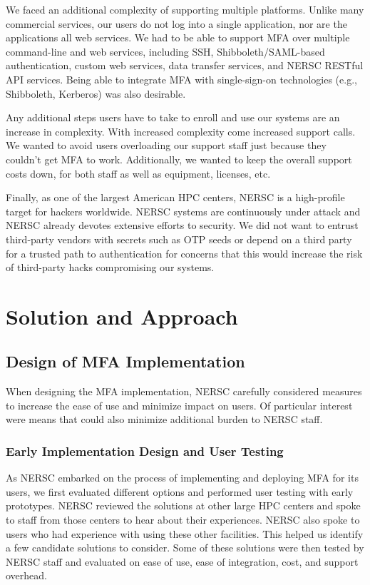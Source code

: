 \documentclass[sigconf,review]{acmart}
\begin{document}
We faced an additional complexity of supporting multiple platforms. Unlike many
commercial services, our users do not log into a single application, nor are the
applications all web services.  We had to be able to support MFA over multiple
command-line and web services, including SSH, Shibboleth/SAML-based
authentication, custom web services, data transfer services, and NERSC RESTful
API services.  Being able to integrate MFA with single-sign-on technologies
(e.g., Shibboleth, Kerberos) was also desirable.

Any additional steps users have to take to enroll and use our systems are an
increase in complexity.  With increased complexity come increased support calls.
We wanted to avoid users overloading our support staff just because they
couldn't get MFA to work.  Additionally, we wanted to keep the overall support
costs down, for both staff as well as equipment, licenses, etc.

Finally, as one of the largest American HPC centers, NERSC is a high-profile
target for hackers worldwide. NERSC systems are continuously under attack and
NERSC already devotes extensive efforts to security. We did not want to entrust
third-party vendors with secrets such as OTP seeds or depend on a third party
for a trusted path to authentication for concerns that this would increase the
risk of third-party hacks compromising our systems.


\section{Solution and Approach}
\label{solns}

\subsection{Design of MFA Implementation}
\label{design}

When designing the MFA implementation, NERSC carefully considered measures to
increase the ease of use and minimize impact on users. Of particular interest
were means that could also minimize additional burden to NERSC staff.

\subsubsection{Early Implementation Design and User Testing}
\label{early}

As NERSC embarked on the process of implementing and deploying MFA for its
users, we first evaluated different options and performed user testing with
early prototypes.  NERSC reviewed the solutions at other large HPC centers and
spoke to staff from those centers to hear about their experiences.  NERSC also
spoke to users who had experience with using these other facilities.  This
helped us identify a few candidate solutions to consider.  Some of these
solutions were then tested by NERSC staff and evaluated on ease of use, ease of
integration, cost, and support overhead.
\end{document}
